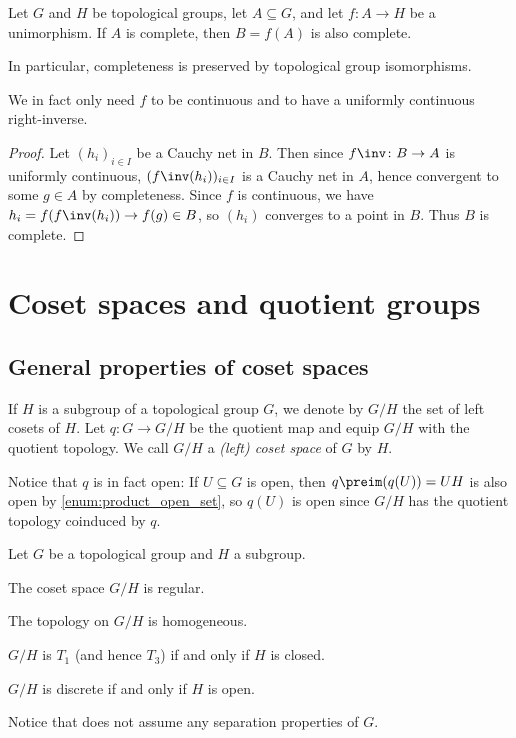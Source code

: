\documentclass[article, a4paper, 11pt, oneside]{memoir}
\numberwithin{equation}{chapter}
\begin{document}
\begin{theorem}
    \label{thm:completeness-preserved-by-unimorphism}
    Let $G$ and $H$ be topological groups, let $A \subseteq G$, and let $f \colon A \to H$ be a unimorphism. If $A$ is complete, then $B = f(A)$ is also complete.

    In particular, completeness is preserved by topological group isomorphisms.
\end{theorem}
%
We in fact only need $f$ to be continuous and to have a uniformly continuous right-inverse.

\begin{proof}
    Let $(h_i)_{i \in I}$ be a Cauchy net in $B$. Then since $f\inv \colon B \to A$ is uniformly continuous, $(f\inv(h_i))_{i \in I}$ is a Cauchy net in $A$, hence convergent to some $g \in A$ by completeness. Since $f$ is continuous, we have $h_i = f(f\inv(h_i)) \to f(g) \in B$, so $(h_i)$ converges to a point in $B$. Thus $B$ is complete.
\end{proof}


\chapter{Coset spaces and quotient groups}

\section{General properties of coset spaces}

If $H$ is a subgroup of a topological group $G$, we denote by $G/H$ the set of left cosets of $H$. Let $q \colon G \to G/H$ be the quotient map and equip $G/H$ with the quotient topology. We call $G/H$ a \emph{(left) coset space} of $G$ by $H$.

Notice that $q$ is in fact open: If $U \subseteq G$ is open, then $q\preim(q(U)) = UH$ is also open by \cref{enum:product_open_set}, so $q(U)$ is open since $G/H$ has the quotient topology coinduced by $q$.


\begin{proposition}
    Let $G$ be a topological group and $H$ a subgroup.
    \begin{enumprop}
        \item \label{enum:coset_space_regular} The coset space $G/H$ is regular.

        \item The topology on $G/H$ is homogeneous.
        
        \item \label{enum:coset_space_T1} $G/H$ is $T_1$ (and hence $T_3$) if and only if $H$ is closed.

        \item $G/H$ is discrete if and only if $H$ is open.
    \end{enumprop}
\end{proposition}
%
Notice that  does not assume any separation properties of $G$.
\end{document}
